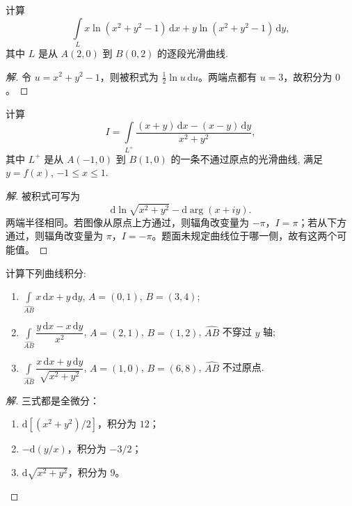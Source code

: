 \documentclass[../../数学分析培优讲义(答案版).tex]{subfiles}
\begin{document}
\begin{example}
计算
\[
    \int\limits_Lx\ln(x^2+y^2-1)\,\mathrm{d}x+y\ln(x^2+y^2-1)\,\mathrm{d}y,
\]
其中 $L$ 是从 $A(2,0)$ 到 $B(0,2)$ 的逐段光滑曲线.
\end{example}

\begin{proof}[解]
令 $u=x^2+y^2-1$，则被积式为 $\frac{1}{2}\ln u\,\mathrm{d}u$。两端点都有 $u=3$，故积分为 $0$。
\end{proof}

\begin{example}
计算
\[
    I=\int\limits_{L^+}\dfrac{(x+y)\,\mathrm{d}x-(x-y)\,\mathrm{d}y}{x^2+y^2},
\]
其中 $L^+$ 是从 $A(-1,0)$ 到 $B(1,0)$ 的一条不通过原点的光滑曲线, 满足 $y=f(x)$, $-1\leq x\leq1$.
\end{example}

\begin{proof}[解]
被积式可写为
\[
\mathrm{d}\ln\sqrt{x^2+y^2}-\mathrm{d}\arg(x+iy).
\]
两端半径相同。若图像从原点上方通过，则辐角改变量为 $-\pi$，$I=\pi$；若从下方通过，则辐角改变量为 $\pi$，$I=-\pi$。题面未规定曲线位于哪一侧，故有这两个可能值。
\end{proof}

\begin{example}
计算下列曲线积分:
\begin{enumerate}[label=(\arabic*)]
    \item $\displaystyle\int\limits_{\widehat{AB}}x\,\mathrm{d}x+y\,\mathrm{d}y$, $A=(0,1)$, $B=(3,4)$;
    \item $\displaystyle\int\limits_{\widehat{AB}}\dfrac{y\,\mathrm{d}x-x\,\mathrm{d}y}{x^2}$, $A=(2,1)$, $B=(1,2)$, $\widehat{AB}$ 不穿过 $y$ 轴;
    \item $\displaystyle\int\limits_{\widehat{AB}}\dfrac{x\,\mathrm{d}x+y\,\mathrm{d}y}{\sqrt{x^2+y^2}}$, $A=(1,0)$, $B=(6,8)$, $\widehat{AB}$ 不过原点.
\end{enumerate}
\end{example}

\begin{proof}[解]
三式都是全微分：
\begin{enumerate}[label=(\arabic*)]
\item $\mathrm{d}[(x^2+y^2)/2]$，积分为 $12$；
\item $-\mathrm{d}(y/x)$，积分为 $-3/2$；
\item $\mathrm{d}\sqrt{x^2+y^2}$，积分为 $9$。
\end{enumerate}
\end{proof}
\end{document}

